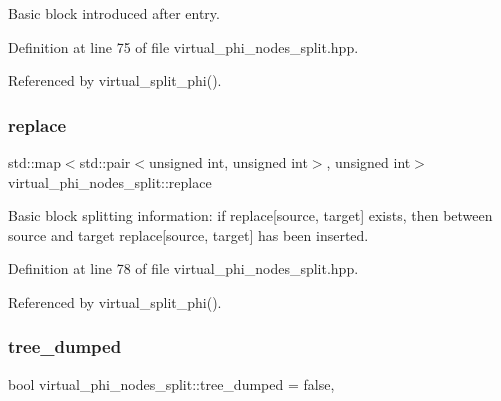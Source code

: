 Basic block introduced after entry. 



Definition at line 75 of file virtual\+\_\+phi\+\_\+nodes\+\_\+split.\+hpp.



Referenced by virtual\+\_\+split\+\_\+phi().

\mbox{\label{classvirtual__phi__nodes__split_a602292dc76cb77744e814f4e83412816}} 
\subsubsection{\texorpdfstring{replace}{replace}}
{\footnotesize\ttfamily std\+::map$<$std\+::pair$<$unsigned int, unsigned int$>$, unsigned int$>$ virtual\+\_\+phi\+\_\+nodes\+\_\+split\+::replace\hspace{0.3cm}{\ttfamily [private]}}



Basic block splitting information\+: if replace\mbox{[}source, target\mbox{]} exists, then between source and target replace\mbox{[}source, target\mbox{]} has been inserted. 



Definition at line 78 of file virtual\+\_\+phi\+\_\+nodes\+\_\+split.\+hpp.



Referenced by virtual\+\_\+split\+\_\+phi().

\mbox{\label{classvirtual__phi__nodes__split_aaf6c14f3a8d83e8a2ad3f97d23337cf8}} 
\subsubsection{\texorpdfstring{tree\+\_\+dumped}{tree\_dumped}}
{\footnotesize\ttfamily bool virtual\+\_\+phi\+\_\+nodes\+\_\+split\+::tree\+\_\+dumped = false\hspace{0.3cm}{\ttfamily [static]}, {\ttfamily [private]}}



